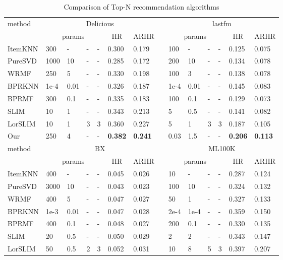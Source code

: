 \documentclass[letterpaper]{article}
\begin{document}
\begin{table}[ht]
\begin{center}
\begin{threeparttable}
\caption{Comparison of Top-N recommendation algorithms}
\label{tab:comp}
\tiny
\begin{tabular}{llllllllllllll}
\hline
\multirow{2}{*}{method} &
\multicolumn{6}{c}{Delicious} &
\multicolumn{1}{c}{}&
\multicolumn{6}{c}{lastfm} \\
\cline{2-7} \cline{9-14}
& \multicolumn{4}{c}{params} &\multicolumn{1}{c}{HR}  & \multicolumn{1}{c}{ARHR} &\multicolumn{1}{c}{}&\multicolumn{4}{c}{params} &\multicolumn{1}{c}{HR}  & \multicolumn{1}{c}{ARHR} \\
\hline
ItemKNN&300&-&-&-&0.300&0.179&&100&-&-&-&0.125&0.075\\
PureSVD&1000&10&-&-&0.285&0.172&&200&10&-&-&0.134&0.078\\
WRMF&250&5&-&-&0.330&0.198&&100&3&-&-&0.138&0.078\\
BPRKNN&1e-4&0.01&-&-&0.326&0.187&&1e-4&0.01&-&-&0.145&0.083\\
BPRMF&300&0.1&-&-&0.335&0.183&&100&0.1&-&-&0.129&0.073\\
SLIM&10&1&-&-&0.343&0.213&&5&0.5&-&-&0.141&0.082\\
LorSLIM&10&1&3&3&0.360&0.227&&5&1&3&3&0.187&0.105\\
Our&250&4&-&-&\bf{0.382}&\bf{0.241}&&0.03&1.5&-&-&\bf{0.206}&\bf{0.113}\\
\hline\hline
\multirow{2}{*}{method} &
\multicolumn{6}{c}{BX} &
\multicolumn{1}{c}{}&
\multicolumn{6}{c}{ML100K} \\
\cline{2-7} \cline{9-14}
& \multicolumn{4}{c}{params} &\multicolumn{1}{c}{HR}  & \multicolumn{1}{c}{ARHR} &\multicolumn{1}{c}{}&\multicolumn{4}{c}{params} &\multicolumn{1}{c}{HR}  & \multicolumn{1}{c}{ARHR} \\
\hline
ItemKNN&400&-&-&-&0.045&0.026&&10&-&-&-&0.287&0.124\\
PureSVD&3000&10&-&-&0.043&0.023&&100&10&-&-&0.324&0.132\\
WRMF&400&5&-&-&0.047&0.027&&50&1&-&-&0.327&0.133\\
BPRKNN&1e-3&0.01&-&-&0.047&0.028&&2e-4&1e-4&-&-&0.359&0.150\\
BPRMF&400&0.1&-&-&0.048&0.027&&200&0.1&-&-&0.330&0.135\\
SLIM&20&0.5&-&-&0.050&0.029&&2&2&-&-&0.343&0.147\\
LorSLIM&50&0.5&2&3&0.052&0.031&&10&8&5&3&0.397&0.207\\

\end{tabular}
\end{threeparttable}
\end{center}
\end{table}
\end{document}
